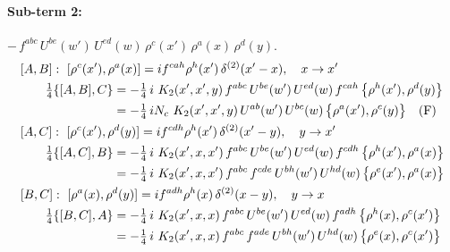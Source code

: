 \documentclass[10pt]{article}
\numberwithin{equation}{section}
\begin{document}
\paragraph{Sub-term 2:} $-\,f^{abc}\,U^{be}(w')\,U^{ed}(w)\,\rho^{c}(x')\,\rho^{a}(x)\,\rho^{d}(y)$.
\begin{align}
&[A,B]:\ [\rho^{c}(x'),\rho^{a}(x)]=i f^{cah}\rho^{h}(x')\,\delta^{(2)}(x'-x),\quad x\to x'\notag\\
&\qquad \tfrac14\{[A,B],C\}=-\tfrac14\,i\,\,K_2(x',x',y)\,f^{abc}\,U^{be}(w')\,U^{ed}(w)\,f^{cah}\,\big\{\rho^{h}(x'),\rho^{d}(y)\big\}\notag\\
&\qquad\phantom{\tfrac14\{[A,B],C\}}=-\tfrac14\,i N_{c}\,\,K_2(x',x',y)\,U^{ab}(w')\,U^{bc}(w)\,\big\{\rho^{a}(x'),\rho^{c}(y)\big\}\quad\text{(F)}
\label{R:eq:A2-2-AB}\\
&[A,C]:\ [\rho^{c}(x'),\rho^{d}(y)]=i f^{cdh}\rho^{h}(x')\,\delta^{(2)}(x'-y),\quad y\to x'\notag\\
&\qquad \tfrac14\{[A,C],B\}=-\tfrac14\,i\,\,K_2(x',x,x')\,f^{abc}\,U^{be}(w')\,U^{ed}(w)\,f^{cdh}\,\big\{\rho^{h}(x'),\rho^{a}(x)\big\}\notag\\
&\qquad\phantom{\tfrac14\{[A,C],B\}}=-\tfrac14\,i\,\,K_2(x',x,x')\,f^{abc}\,f^{cde}\,U^{bh}(w')\,U^{hd}(w)\,\big\{\rho^{e}(x'),\rho^{a}(x)\big\}
\label{R:eq:A2-2-AC}\\
&[B,C]:\ [\rho^{a}(x),\rho^{d}(y)]=i f^{adh}\rho^{h}(x)\,\delta^{(2)}(x-y),\quad y\to x\notag\\
&\qquad \tfrac14\{[B,C],A\}=-\tfrac14\,i\,\,K_2(x',x,x)\,f^{abc}\,U^{be}(w')\,U^{ed}(w)\,f^{adh}\,\big\{\rho^{h}(x),\rho^{c}(x')\big\}\notag\\
&\qquad\phantom{\tfrac14\{[B,C],A\}}=-\tfrac14\,i\,\,K_2(x',x,x)\,f^{abc}\,f^{ade}\,U^{bh}(w')\,U^{hd}(w)\,\big\{\rho^{e}(x),\rho^{c}(x')\big\}
\label{R:eq:A2-2-BC}
\end{align}
\end{document}
